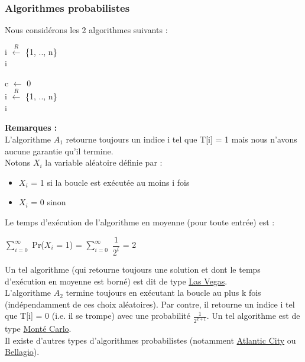 \documentclass[12pt,a4paper]{article}
\begin{document}
\subsubsection{Algorithmes probabilistes}
Nous considérons les 2 algorithmes suivants :\\
\begin{algorithm}[H]
	\caption{$A_1$}
	i $\xleftarrow{R}$ \{1, .., n\}\\
	\Return i
\end{algorithm}
\begin{algorithm}[H]
	\caption{$A_2$}
	c $\gets$ 0\\
	i $\xleftarrow{R}$ \{1, .., n\}\\
	\Return i
\end{algorithm}
\textbf{Remarques :}\\
L'algorithme $A_1$ retourne toujours un indice i tel que T[i] = 1 mais nous n'avons aucune garantie qu'il termine.\\
Notons $X_i$ la variable aléatoire définie par :
\begin{itemize}
	\item $X_i$ = 1 si la boucle est exécutée au moins i fois
	\item $X_i$ = 0 sinon
\end{itemize}
Le temps d'exécution de l'algorithme en moyenne (pour toute entrée) est :
\begin{center}
	$\sum\limits_{i = 0}^{\infty}$ Pr($X_i$ = 1) = $\sum\limits_{i = 0}^{\infty}$ $\dfrac{1}{2^i}$ = 2
\end{center}
Un tel algorithme (qui retourne toujours une solution et dont le temps d'exécution en moyenne est borné) est dit de type \underline{Las Vegas}.\\
L'algorithme $A_2$ termine toujours en exécutant la boucle au plus k fois (indépendamment de ces choix aléatoires). Par contre, il retourne un indice i tel que T[i] = 0 (i.e. il se trompe) avec une probabilité $\frac{1}{2^{k+1}}$. Un tel algorithme est de type \underline{Monté Carlo}.\\
Il existe d'autres types d'algorithmes probabilistes (notamment \underline{Atlantic City} ou \underline{Bellagio}).
\end{document}
